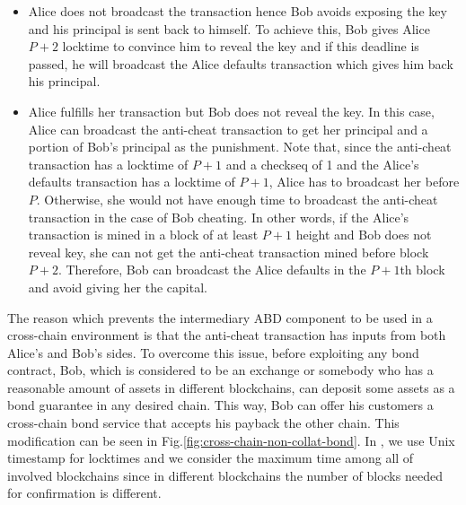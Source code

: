 \begin{itemize}
\begin{itemize}
        \item Alice does not broadcast the  transaction hence Bob avoids exposing the \keyone key and his principal is sent back to himself. To achieve this, Bob gives Alice $P + 2$ locktime to convince him to reveal the \keyone key and if this deadline is passed, he will broadcast the Alice defaults transaction which gives him back his principal.
        
        \item Alice fulfills her  transaction but Bob does not reveal the \keyone key. In this case, Alice can broadcast the anti-cheat transaction to get her principal and a portion of Bob's principal as the punishment. Note that, since the anti-cheat transaction has a locktime of $P + 1$ and a checkseq of 1 and the Alice's defaults transaction has a locktime of $P + 1$, Alice has to broadcast her  before $P$. Otherwise, she would not have enough time to broadcast the anti-cheat transaction in the case of Bob cheating. In other words, if the Alice's  transaction is mined in a block of at least $P + 1$ height and Bob does not reveal \keyone key, she can not get the anti-cheat transaction mined before block $P + 2$. Therefore, Bob can broadcast the Alice defaults in the $P + 1$th block and avoid giving her the capital.
    \end{itemize}
\end{itemize}

The reason which prevents the intermediary ABD component to be used in a cross-chain environment is that the anti-cheat transaction has inputs from both Alice's and Bob's sides. To overcome this issue, before exploiting any bond contract, Bob, which is considered to be an exchange or somebody who has a reasonable amount of assets in different blockchains, can deposit some assets as a bond guarantee in any desired chain. This way, Bob can offer his customers a cross-chain bond service that accepts his payback  the other chain. This modification can be seen in Fig.\ref{fig:cross-chain-non-collat-bond}. In \abcd, we use Unix timestamp for locktimes and we consider the maximum time among all of involved blockchains since in different blockchains the number of blocks needed for confirmation is different.


